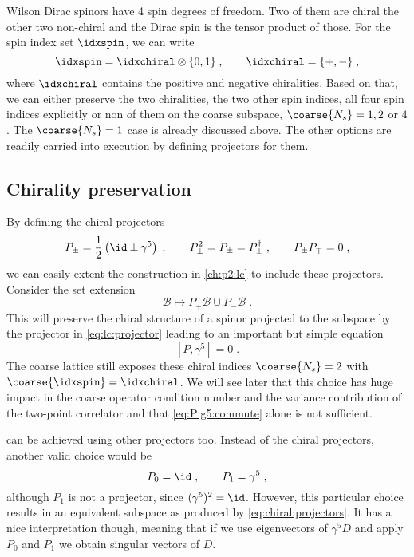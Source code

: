 Wilson Dirac spinors have \num{4} spin degrees of freedom.
Two of them are chiral the other two non-chiral and the Dirac spin is the tensor product of those.
For the spin index set $\idxspin$, we can write
\begin{equation}
\idxspin = \idxchiral \otimes \{0, 1\} \;,
\qquad
\idxchiral = \{ +, - \} \;,
\end{equation}
where $\idxchiral$ contains the positive and negative chiralities.
Based on that, we can either preserve the two chiralities, the two other spin indices, all four spin indices explicitly or non of them on the coarse subspace, $\coarse{N_s} = 1,2$ or $4$.
The $\coarse{N_s} = 1$ case is already discussed above.
The other options are readily carried into execution by defining projectors for them.

\subsection{Chirality preservation}

By defining the chiral projectors
\begin{equation} \label{eq:chiral:projectors}
P_{\pm} = \frac{1}{2} \left( \id \pm \gamma^{5} \right) \;,
\qquad
P_{\pm}^{2} = P_{\pm} = P_{\pm}^{\dagger} \;,
\qquad
P_{\pm} P_{\mp} = 0 \;,
\end{equation}
we can easily extent the construction in \cref{ch:p2:lc} to include these projectors.
Consider the set extension
\begin{equation} \label{eq:bootstrap:chiral}
\mathcal{B} \longmapsto P_{+} \mathcal{B} \cup P_{-} \mathcal{B} \;.
\end{equation}
This will preserve the chiral structure of a spinor projected to the subspace by the projector in \cref{eq:lc:projector} leading to an important but simple equation
\begin{equation} \label{eq:P:g5:commute}
[P, \gamma^{5}] = 0 \;.
\end{equation}
The coarse lattice still exposes these chiral indices $\coarse{N_s} = 2$ with $\coarse{\idxspin} = \idxchiral$.
We will see later that this choice has huge impact in the coarse operator condition number and the variance contribution of the two-point correlator and that \cref{eq:P:g5:commute} alone is not sufficient.

 can be achieved using other projectors too.
Instead of the chiral projectors, another valid choice would be
\begin{equation} \label{eq:chiral:projectors:id:g5}
P_0 = \id \;,
\qquad
P_1 = \gamma^{5} \;,
\end{equation}
although $P_1$ is not a projector, since $(\gamma^5)^2 = \id$.
However, this particular choice results in an equivalent subspace as produced by \cref{eq:chiral:projectors}.
It has a nice interpretation though, meaning that if we use eigenvectors of $\gamma^5 D$ and apply $P_0$ and $P_1$ we obtain singular vectors of $D$.

